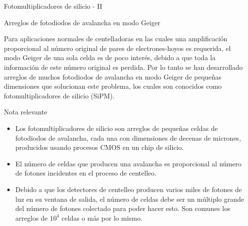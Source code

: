 \documentclass[a4paper,10pt]{beamer}
\begin{document}
\begin{frame}{Fotomultiplicadores de silicio - II}
 
 {\large{\color{blue}Arreglos de fotodiodos de avalancha en modo Geiger}}
 
 \begin{justify}
 \small
  Para aplicaciones normales de centelladoras en las cuales una amplificación proporcional 
  al número original de pares de electrones-hoyos es requerida, el modo Geiger de una 
  sola celda es de poco interés, debido a que toda la información de este número 
  original es perdida. Por lo tanto se han desarrollado arreglos de muchos fotodiodos 
  de avalancha en modo Geiger de pequeñas dimensiones que solucionan este problema, 
  los cuales son conocidos como fotomultiplicadores de silicio (SiPM).
 \end{justify}
 
 \begin{block}{Nota relevante}
  \begin{itemize}[<+->]
   \item \begin{justify}
          Los fotomultiplicadores de silicio son arreglos de pequeñas celdas de 
          fotodiodos de avalancha, cada una con dimensiones de decenas de micrones, 
          producidos usando procesos CMOS en un chip de silicio.
         \end{justify}
   \item \begin{justify}
          El número de celdas que producen una avalancha es proporcional al número de 
          fotones incidentes en el proceso de centelleo.
         \end{justify}
   \item \begin{justify}
          Debido a que los detectores de centelleo producen varios miles de fotones 
          de luz en su ventana de salida, el número de celdas debe ser un múltiplo 
          grande del número de fotones colectado para poder hacer esto. Son comunes 
          los arreglos de $10^4$ celdas o más por lo mismo.
         \end{justify}
  \end{itemize}

 \end{block}

\end{frame}
\end{document}
